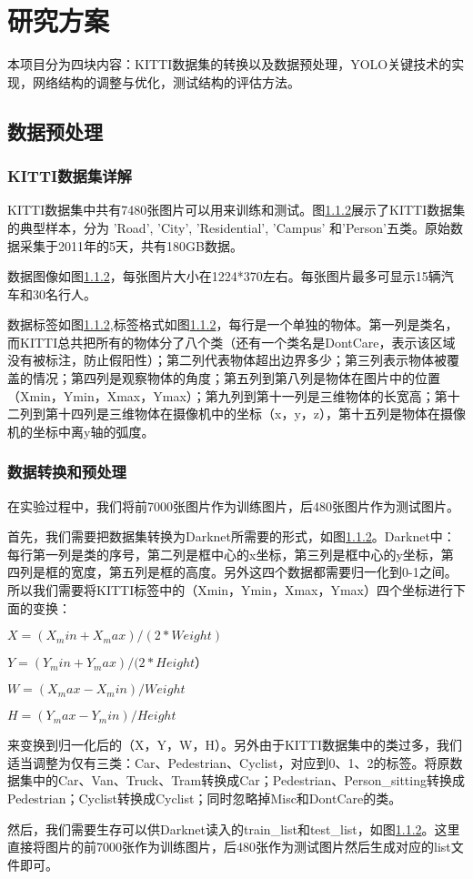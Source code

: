 \chapter{研究方案}
本项目分为四块内容：KITTI数据集的转换以及数据预处理，YOLO关键技术的实现，网络结构的调整与优化，测试结构的评估方法。
\section{数据预处理}{
	\subsection{KITTI数据集详解}
	KITTI数据集中共有7480张图片可以用来训练和测试。图\ref{}展示了KITTI数据集的典型样本，分为 ’Road’, ’City’, ’Residential’, ’Campus’ 和’Person’五类。原始数据采集于2011年的5天，共有180GB数据。

	数据图像如图\ref{}，每张图片大小在1224*370左右。每张图片最多可显示15辆汽车和30名行人。

	数据标签如图\ref{},标签格式如图\ref{}，每行是一个单独的物体。第一列是类名，而KITTI总共把所有的物体分了八个类（还有一个类名是DontCare，表示该区域没有被标注，防止假阳性）；第二列代表物体超出边界多少；第三列表示物体被覆盖的情况；第四列是观察物体的角度；第五列到第八列是物体在图片中的位置（Xmin，Ymin，Xmax，Ymax）；第九列到第十一列是三维物体的长宽高；第十二列到第十四列是三维物体在摄像机中的坐标（x，y，z），第十五列是物体在摄像机的坐标中离y轴的弧度。

	\subsection{数据转换和预处理}
	在实验过程中，我们将前7000张图片作为训练图片，后480张图片作为测试图片。

	首先，我们需要把数据集转换为Darknet所需要的形式，如图\ref{}。Darknet中：每行第一列是类的序号，第二列是框中心的x坐标，第三列是框中心的y坐标，第四列是框的宽度，第五列是框的高度。另外这四个数据都需要归一化到0-1之间。所以我们需要将KITTI标签中的（Xmin，Ymin，Xmax，Ymax）四个坐标进行下面的变换：

	$X = (X_min + X_max) / (2 * Weight)$

	$Y = (Y_min + Y_max) / (2 * Height）$

	$W = (X_max - X_min) / Weight$

	$H = (Y_max - Y_min) / Height$

	来变换到归一化后的（X，Y，W，H）。另外由于KITTI数据集中的类过多，我们适当调整为仅有三类：Car、Pedestrian、Cyclist，对应到0、1、2的标签。将原数据集中的Car、Van、Truck、Tram转换成Car；Pedestrian、Person_sitting转换成Pedestrian；Cyclist转换成Cyclist；同时忽略掉Misc和DontCare的类。

	然后，我们需要生存可以供Darknet读入的train_list和test_list，如图\ref{}。这里直接将图片的前7000张作为训练图片，后480张作为测试图片然后生成对应的list文件即可。
}

